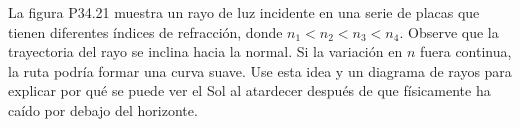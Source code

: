 \item La figura P34.21 muestra un rayo de luz incidente en una serie de placas que tienen diferentes índices de refracción, donde $n_1 < n_2 < n_3 < n_4$. Observe que la trayectoria del rayo se inclina hacia la normal. Si la variación en $n$ fuera continua, la ruta podría formar una curva suave. Use esta idea y un diagrama de rayos para explicar por qué se puede ver el Sol al atardecer después de que físicamente ha caído por debajo del horizonte.